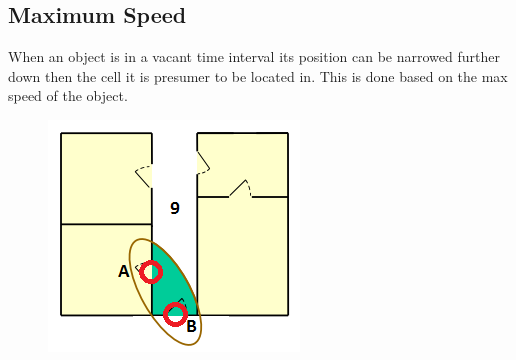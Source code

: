 \subsection{Maximum Speed}
When an object is in a vacant time interval its position can be narrowed further down then the cell it is presumer to be located in. 
This is done based on the max speed of the object. 


\begin{figure}%
\includegraphics{images/indoorSpeed.png}%
\caption{}%
\label{}%
\end{figure}